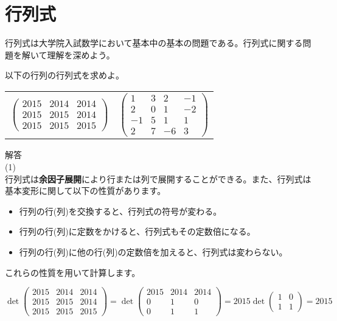 \documentclass{jlreq}
\begin{document}
\section{行列式}
行列式は大学院入試数学において基本中の基本の問題である。行列式に関する問題を解いて理解を深めよう。
\begin{problem}
  以下の行列の行列式を求めよ。
  \begin{center}
    \begin{tabular}{cc}
      $\displaystyle
        \begin{pmatrix}
          2015 & 2014 & 2014 \\
          2015 & 2015 & 2014 \\
          2015 & 2015 & 2015
        \end{pmatrix}
      $
      & \hspace{2cm} %
      $\displaystyle
        \begin{pmatrix}
          1 & 3 & 2 & -1 \\
          2 & 0 & 1 & -2 \\
          -1 & 5 & 1 & 1 \\
          2 & 7 & -6 & 3
        \end{pmatrix}
      $
    \end{tabular}
  \end{center}
  \dotfill

  解答 \\
  (1) \\
  行列式は\textbf{余因子展開}により行または列で展開することができる。また、行列式は基本変形に関して以下の性質があります。

  \begin{itemize}
    \item 行列の行(列)を交換すると、行列式の符号が変わる。
    \item 行列の行(列)に定数をかけると、行列式もその定数倍になる。
    \item 行列の行(列)に他の行(列)の定数倍を加えると、行列式は変わらない。
  \end{itemize}

  これらの性質を用いて計算します。

  \begin{equation*}
    \det \begin{pmatrix}
      2015 & 2014 & 2014 \\
      2015 & 2015 & 2014 \\
      2015 & 2015 & 2015
    \end{pmatrix} = \det \begin{pmatrix}
      2015 & 2014 & 2014 \\
      0 & 1 & 0 \\
      0 & 1 & 1
    \end{pmatrix} = 2015 \det \begin{pmatrix}
      1 & 0 \\
      1 & 1
    \end{pmatrix} = 2015
  \end{equation*}


\end{problem}
\end{document}
